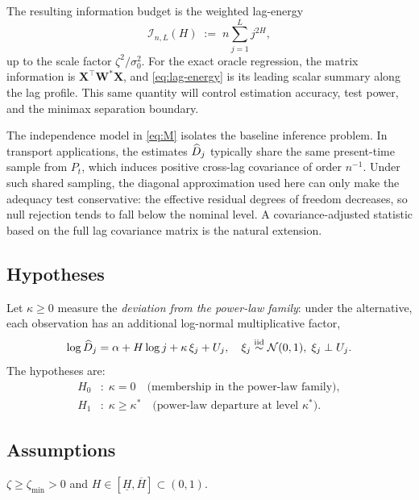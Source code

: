 The resulting information budget is the weighted lag-energy
\begin{equation}
    \mathcal I_{n,L}(H)
    \;:=\;
    n \sum_{j=1}^L j^{2H},
    \label{eq:lag-energy}
\end{equation}
up to the scale factor $\zeta^2/\sigma_0^2$.  For the exact oracle regression,
the matrix information is $\mathbf X^\top \mathbf W^* \mathbf X$, and
\eqref{eq:lag-energy} is its leading scalar summary along the lag profile.
This same quantity will control estimation accuracy, test power, and the
minimax separation boundary.

\begin{remark}
    The independence model in \eqref{eq:M} isolates the baseline inference
    problem.  In transport applications, the estimates $\widehat{D}_j$ typically share
    the same present-time sample from $P_t$, which induces positive cross-lag
    covariance of order $n^{-1}$.  Under such shared sampling, the diagonal
    approximation used here can only make the adequacy test conservative: the
    effective residual degrees of freedom decreases, so null rejection tends to
    fall below the nominal level.  A covariance-adjusted statistic based on the
    full lag covariance matrix is the natural extension.
\end{remark}

\subsection{Hypotheses}

Let $\kappa \geq 0$ measure the \emph{deviation from the power-law family}: under the
alternative, each observation has an additional log-normal multiplicative
factor,
\[
    \log \widehat{D}_j = \alpha + H\log j + \kappa\,\xi_j + U_j,\quad
    \xi_j \overset{\text{iid}}{\sim} \mathcal{N}(0,1),\;\xi_j \perp U_j.
\]
The hypotheses are:
\begin{align*}
    H_0&:\; \kappa = 0 \quad\text{(membership in the power-law family)},\\
    H_1&:\; \kappa \geq \kappa^* \quad\text{(power-law departure at level } \kappa^*\text{)}.
\end{align*}

\subsection{Assumptions}

\begin{assumption}
\label{ass:signal}
$\zeta \geq \zeta_{\min} > 0$ and $H \in [\underline{H}, \overline{H}]
\subset (0,1)$.
\end{assumption}

